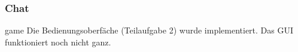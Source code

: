 \documentclass{beamer}
\begin{document}
	    \label{Frame6}	
		\begin{frame}
			\frametitle{Chat}
			\begin{block}{game}
				Die Bedienungsoberfäche (Teilaufgabe 2) wurde implementiert. Das GUI funktioniert noch nicht ganz.
			\end{block}		
		\end{frame}
\end{document}
